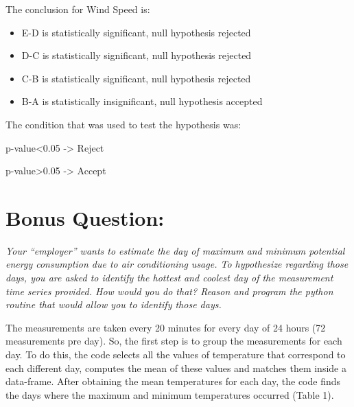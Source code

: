 \documentclass[a4paper,12pt]{article}
\begin{document}
The conclusion for Wind Speed is:

\begin{itemize}

\item{E-D is statistically significant, null hypothesis rejected}


\item{D-C is statistically significant, null hypothesis rejected}


\item{C-B is statistically significant, null hypothesis rejected}


\item{B-A is statistically insignificant, null hypothesis accepted}

\end{itemize}

The condition that was used to test the hypothesis was:


p-value<0.05  ->  Reject


p-value>0.05  ->  Accept





\section{\bf Bonus Question:}

{\it Your “employer” wants to estimate the day of maximum and minimum potential energy 
consumption due to air conditioning usage. To hypothesize regarding those days, 
you are asked to identify the hottest and coolest day of the measurement time series provided. 
How would you do that? Reason and program the python routine that would allow you to identify those days.}




The measurements are taken every 20 minutes for every day of 24 hours (72 measurements pre day). 
So, the first step is to group the measurements for each day. To do this, the code selects all the values
of temperature that correspond to each different day, computes the mean of these values and matches them
inside a data-frame. After obtaining the mean temperatures for each day, the code finds the days where the maximum and minimum 
temperatures occurred (Table 1).
\end{document}
